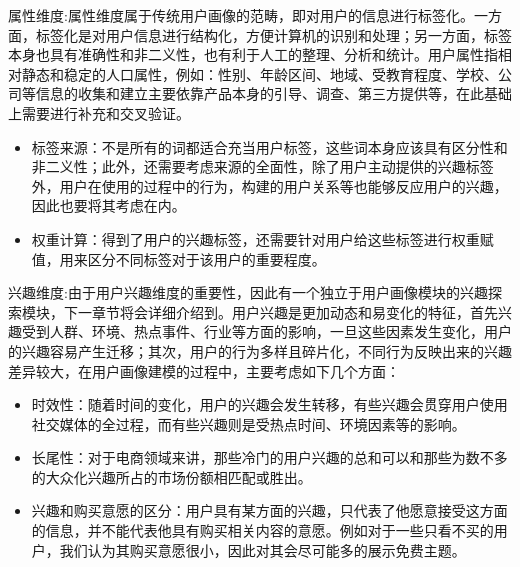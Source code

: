         属性维度:属性维度属于传统用户画像的范畴，即对用户的信息进行标签化。一方面，标签化是对用户信息进行结构化，方便计算机的识别和处理；另一方面，标签本身也具有准确性和非二义性，也有利于人工的整理、分析和统计。用户属性指相对静态和稳定的人口属性，例如：性别、年龄区间、地域、受教育程度、学校、公司等信息的收集和建立主要依靠产品本身的引导、调查、第三方提供等，在此基础上需要进行补充和交叉验证。
        \begin{itemize}
        \item 标签来源：不是所有的词都适合充当用户标签，这些词本身应该具有区分性和非二义性；此外，还需要考虑来源的全面性，除了用户主动提供的兴趣标签外，用户在使用的过程中的行为，构建的用户关系等也能够反应用户的兴趣，因此也要将其考虑在内。
        \item 权重计算：得到了用户的兴趣标签，还需要针对用户给这些标签进行权重赋值，用来区分不同标签对于该用户的重要程度。
        \end{itemize}

        兴趣维度:由于用户兴趣维度的重要性，因此有一个独立于用户画像模块的兴趣探索模块，下一章节将会详细介绍到。用户兴趣是更加动态和易变化的特征，首先兴趣受到人群、环境、热点事件、行业等方面的影响，一旦这些因素发生变化，用户的兴趣容易产生迁移；其次，用户的行为多样且碎片化，不同行为反映出来的兴趣差异较大，在用户画像建模的过程中，主要考虑如下几个方面：
        \begin{itemize}
        \item 时效性：随着时间的变化，用户的兴趣会发生转移，有些兴趣会贯穿用户使用社交媒体的全过程，而有些兴趣则是受热点时间、环境因素等的影响。
        \item 长尾性：对于电商领域来讲，那些冷门的用户兴趣的总和可以和那些为数不多的大众化兴趣所占的市场份额相匹配或胜出。
        \item 兴趣和购买意愿的区分：用户具有某方面的兴趣，只代表了他愿意接受这方面的信息，并不能代表他具有购买相关内容的意愿。例如对于一些只看不买的用户，我们认为其购买意愿很小，因此对其会尽可能多的展示免费主题。
        \end{itemize}

